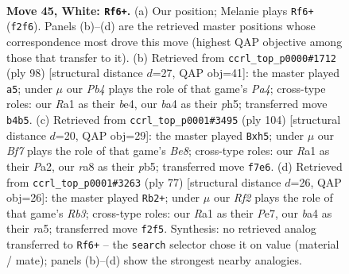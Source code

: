 \documentclass[11pt]{article}
\begin{document}
\clearpage

\begin{figure}[p]\centering
\begin{subfigure}{0.46\textwidth}\centering
\resizebox{\linewidth}{!}{%
\newchessgame
\chessboard[
  setfen={r7/1p3B2/p6k/4P2p/bP1r4/P6K/5R2/R7 w - - 3 45},
  showmover=false,
  pgfstyle=straightmove, color=movearrow, markmove={f2-f6}
]}
\caption{}
\end{subfigure}\hfill
\begin{subfigure}{0.46\textwidth}\centering
\resizebox{\linewidth}{!}{%
\newchessgame
\chessboard[
  setfen={3B4/5k2/5pp1/7p/P3b2P/2R3P1/r7/5K2 w - - 2 50},
  showmover=false,
  pgfstyle=straightmove, color=movearrow, markmove={a4-a5}
]}
\caption{}
\end{subfigure}
\\[4pt]
\begin{subfigure}{0.46\textwidth}\centering
\resizebox{\linewidth}{!}{%
\newchessgame
\chessboard[
  setfen={R3B3/6bk/2pr4/1p4Pp/4p3/6K1/P4P2/8 w - - 4 53},
  showmover=false,
  pgfstyle=straightmove, color=movearrow, markmove={e8-h5}
]}
\caption{}
\end{subfigure}\hfill
\begin{subfigure}{0.46\textwidth}\centering
\resizebox{\linewidth}{!}{%
\newchessgame
\chessboard[
  setfen={8/1b2pk1p/1r4p1/R7/7P/3B1P2/5KP1/8 b - - 7 39},
  showmover=false,
  pgfstyle=straightmove, color=movearrow, markmove={b6-b2}
]}
\caption{}
\end{subfigure}
\caption{\textbf{Move 45, White: \texttt{Rf6+}.} (a) Our position; Melanie plays \texttt{Rf6+} (\texttt{f2f6}). Panels (b)--(d) are the retrieved master positions whose correspondence most drove this move (highest QAP objective among those that transfer to it). (b) Retrieved from \texttt{ccrl\_top\_p0000\#1712} (ply 98) [structural distance $d$=27, QAP obj=41]: the master played \texttt{a5}; under $\mu$ our \emph{Pb4} plays the role of that game's \emph{Pa4}; cross-type roles: our \emph{R}a1 as their \emph{b}e4, our \emph{b}a4 as their \emph{p}h5; transferred move \texttt{b4b5}. (c) Retrieved from \texttt{ccrl\_top\_p0001\#3495} (ply 104) [structural distance $d$=20, QAP obj=29]: the master played \texttt{Bxh5}; under $\mu$ our \emph{Bf7} plays the role of that game's \emph{Be8}; cross-type roles: our \emph{R}a1 as their \emph{P}a2, our \emph{r}a8 as their \emph{p}b5; transferred move \texttt{f7e6}. (d) Retrieved from \texttt{ccrl\_top\_p0001\#3263} (ply 77) [structural distance $d$=26, QAP obj=26]: the master played \texttt{Rb2+}; under $\mu$ our \emph{Rf2} plays the role of that game's \emph{Rb3}; cross-type roles: our \emph{R}a1 as their \emph{P}e7, our \emph{b}a4 as their \emph{r}a5; transferred move \texttt{f2f5}. Synthesis: no retrieved analog transferred to \texttt{Rf6+} -- the \texttt{search} selector chose it on value (material / mate); panels (b)--(d) show the strongest nearby analogies.}
\label{fig:thought-m88}
\end{figure}
\end{document}
